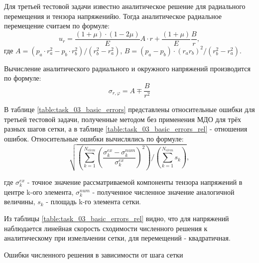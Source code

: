 \documentclass[a4paper]{article}
\begin{document}
\newpage

Для третьей тестовой задачи известно аналитическое решение для радиального перемещения и тензора напряженийю. Тогда аналитическое радиальное перемещение считаем по формуле:
\begin{equation*}
u_r = \frac{(1 + \mu) \cdot (1 - 2\mu)}{E}A \cdot r + \frac{(1 + \mu)}{E} \frac{B}{r},
\end{equation*}
где $A = (p_a \cdot r_a^2 - p_b \cdot r_b^2) / (r_b^2 - r_a^2)$, $B = (p_a - p_b) \cdot (r_a r_b)^2 / (r_b^2 - r_a^2)$.

Вычисление аналитического радиального и окружного напряжений производится по формуле:
\begin{equation*}
\sigma_{r, \varphi} = A \mp \frac{B}{r^2}
\end{equation*}

В таблице \ref{table:task_03_basic_errors} представлены относительные ошибки для третьей тестовой задачи, полученные методом без применения МДО для трёх разных шагов сетки, а в таблице \ref{table:task_03_basic_errors_rel} - отношения ошибок. Относительные ошибки вычислялись по формуле:
\begin{equation*}
\sqrt{\left(\sum_{k = 1}^{N_{elem}} {\left(\frac{\sigma_k^{ex} - \sigma_k^{num}}{\sigma_k^{ex}}\right)^2}\right) / \left(\sum_{k=1}^{N_{elem}} {s_k}\right)},
\end{equation*}

где $\sigma_k^{ex}$ - точное значение рассматриваемой компоненты тензора напряжений в центре k-ого элемента, $\sigma_k^{num}$ - полученное численное значение аналогичной величины, $s_k$ - площадь k-го элемента сетки. 

Из таблицы \ref{table:task_03_basic_errors_rel} видно, что для напряжений наблюдается линейная скорость сходимости численного решения к аналитическому при измельчении сетки, для перемещений - квадратичная.
\begin{table}[h]
\caption{Ошибки численного решения в зависимости от шага сетки}
\label{table:task_03_basic_errors}
\end{table}
\end{document}
